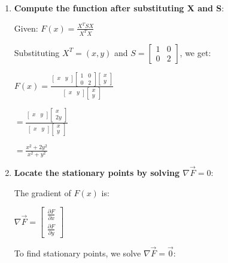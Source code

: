 \documentclass[11pt]{article}
\begin{document}
\begin{enumerate}
\def\labelenumi{\arabic{enumi}.}
\item
  \textbf{Compute the function after substituting X and S}:

  Given: $ F(x) = \frac{X^T S X}{X^T X} $

  Substituting $ X^T = (x, y) $ and $ S =  \begin{bmatrix} 1 & 0 \\ 0 & 2 \end{bmatrix} $, we get:

  $ F(x) =  \frac{\begin{bmatrix} x & y \end{bmatrix} \begin{bmatrix} 1 & 0 \\ 0 & 2 \end{bmatrix} \begin{bmatrix} x \\ y \end{bmatrix}}{\begin{bmatrix} x & y \end{bmatrix} \begin{bmatrix} x \\ y \end{bmatrix}}  $

  $ = \frac{\begin{bmatrix} x & y \end{bmatrix} \begin{bmatrix} x \\ 2y \end{bmatrix}}{\begin{bmatrix} x & y \end{bmatrix} \begin{bmatrix} x \\ y \end{bmatrix}} $

  $ = \frac{x^2 + 2y^2}{x^2 + y^2} $\item  \textbf{Locate the stationary points by solving $ \nabla \vec{F} = 0  $}:

  The gradient of $ F(x) $ is:

  $ \nabla \vec{F} =
  \begin{bmatrix} \frac{\partial F}{\partial x} \\ \frac{\partial F}{\partial y} \end{bmatrix}
  $

  To find stationary points, we solve $ \nabla \vec{F} = \vec{0} $:


\end{enumerate}
\end{document}
